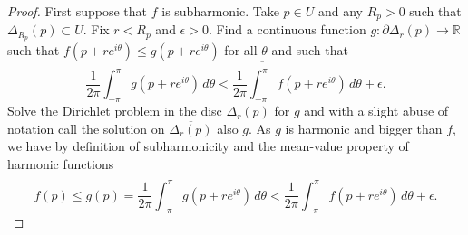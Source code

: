 \documentclass[12pt,openany]{book}
\newcommand{\R}{{\mathbb{R}}}
\theoremstyle{plain}
\theoremstyle{remark}
\theoremstyle{definition}
\theoremstyle{exercise}
\theoremstyle{example}
\begin{document}
\begin{proof}
First suppose that $f$ is subharmonic.  Take $p \in U$ and any $R_p > 0$
such that $\Delta_{R_p}(p) \subset U$.
Fix $r < R_p$ and $\epsilon > 0$.
Find a continuous function $g \colon \partial \Delta_r(p) \to \R$
such that $f(p+ re^{i\theta}) \leq g(p+re^{i\theta})$ for all $\theta$
and such that
\begin{equation*}
\frac{1}{2\pi} \int_{-\pi}^{\pi} g(p+re^{i\theta})\, d\theta <
\frac{1}{2\pi} \overline{\int_{-\pi}^{\pi}} f(p+re^{i\theta})\, d\theta + \epsilon .
\end{equation*}
Solve the Dirichlet problem in the disc $\Delta_r(p)$ for $g$ and
with a slight abuse of notation call the solution on $\overline{\Delta_r(p)}$
also $g$.  As $g$ is harmonic and bigger than $f$, we have by
definition of subharmonicity and the mean-value property of harmonic
functions
\begin{equation*}
f(p) \leq g(p) =
\frac{1}{2\pi} \int_{-\pi}^{\pi} g(p+re^{i\theta})\, d\theta <
\frac{1}{2\pi} \overline{\int_{-\pi}^{\pi}} f(p+re^{i\theta})\, d\theta + \epsilon .
\end{equation*}


\end{proof}
\end{document}
